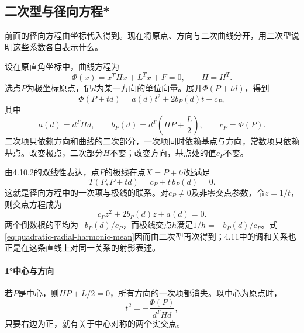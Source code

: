 \newpage
\subsection{二次型与径向方程*}
\label{subsec:quadratic-quadratic-forms-and-radial-equation}

前面的径向方程由坐标代入得到。现在将原点、方向与二次曲线分开，用二次型说明这些系数各自表示什么。

设在原直角坐标中，曲线方程为
\begin{equation*}
 \Phi(x)=x^THx+L^Tx+F=0,\qquad H=H^T.
\end{equation*}
选点\(P\)为极坐标原点，记\(d\)为某一方向的单位向量。展开\(\Phi(P+td)\)，得到
\begin{equation}\label{eq:quadratic-radial-matrix-equation}
 \Phi(P+td)=a(d)t^2+2b_P(d)t+c_P,
\end{equation}
其中
\begin{equation}\label{eq:quadratic-radial-matrix-coefficients}
 a(d)=d^THd,\qquad
 b_P(d)=d^T\left(HP+\frac L2\right),\qquad
 c_P=\Phi(P).
\end{equation}
二次项只依赖方向和曲线的二次部分，一次项同时依赖基点与方向，常数项只依赖基点。改变极点，二次部分\(H\)不变；改变方向，基点处的值\(c_P\)不变。

由4.10.2的双线性表达，点\(P\)的极线在点\(X=P+td\)处满足
\begin{equation}\label{eq:quadratic-radial-matrix-polar}
 T(P,P+td)=c_P+t\,b_P(d)=0.
\end{equation}
这就是径向方程中的一次项与极线的联系。对\(c_P\ne0\)及非零交点参数，令\(z=1/t\)，则交点方程成为
\begin{equation}\label{eq:quadratic-reciprocal-radial-equation}
 c_Pz^2+2b_P(d)z+a(d)=0.
\end{equation}
两个倒数根的平均为\(-b_P(d)/c_P\)，而极线交点\(h\)满足\(1/h=-b_P(d)/c_P\)。式\eqref{eq:quadratic-radial-harmonic-mean}因而由二次型再次得到；4.11中的调和关系也正是在这条直线上对同一关系的射影表述。

\paragraph{1°中心与方向} \mbox{}

若\(P\)是中心，则\(HP+L/2=0\)，所有方向的一次项都消失。以中心为原点时，
\begin{equation}\label{eq:quadratic-centered-radial-form}
 t^2=-\frac{\Phi(P)}{d^THd},
\end{equation}
只要右边为正，就有关于中心对称的两个实交点。

